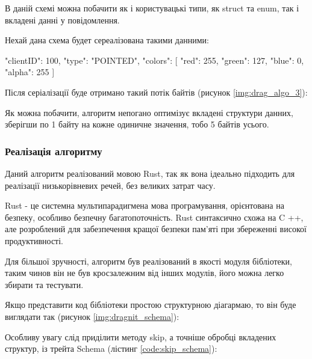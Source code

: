 \documentclass{lib/styles/default-style}
\begin{document}
    В даній схемі можна побачити як і користувацькі типи, як struct та enum, так і вкладені данні у повідомлення.
    
    Нехай дана схема будет сереалізована такими данними:

    \begin{snippet}
        {
            "clientID": 100,
            "type": "POINTED",
            "colors": [
                {
                "red": 255,
                "green": 127,
                "blue": 0,
                "alpha": 255
                }
            ]
        }\end{snippet}
    
    Після серіалізації буде отримано такий потік байтів (рисунок \ref{img:drag_algo_3}):


    Як можна побачити, алгоритм непогано оптимізує вкладені структури данних,
    зберігши по 1 байту на кожне одиничне значення, тобо 5 байтів усього.

    \subsubsection{Реалізація алгоритму}

    Даний алгоритм реалізований мовою Rust, так як вона ідеально підходить для реалізації низькорівневих речей, без великих затрат часу.

    Rust - це системна мультипарадигмена мова програмування, орієнтована на безпеку, особливо безпечну багатопоточність. 
    Rust синтаксично схожа на C ++, але розроблений для забезпечення кращої безпеки пам’яті при збереженні високої продуктивності.

    Для більшої зручності, алгоритм був реалізований в якості модуля бібліотеки, таким чинов він не був кросзалежним від інших модулів,
    його можна легко збирати та тестувати.

    Якщо представити код бібліотеки простою структурною діагармаю, то він буде виглядати так (рисунок \ref{img:dragnit_schema}):


    Особливу увагу слід приділити методу skip, а точніше обробці вкладених структур, із трейта Schema (лістинг \ref{code:skip_schema}):
\end{document}
